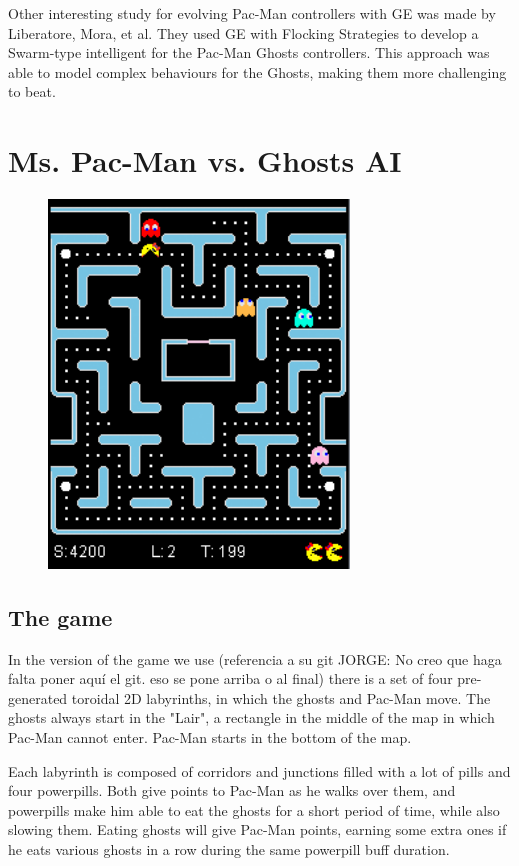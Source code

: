\documentclass{llncs}
\newcommand{\pacman}{Ms. Pac-Man vs. Ghosts }
\newcommand{\paco}{Pac-Man }
\begin{document}
Other interesting study for evolving Pac-Man controllers with GE was made by Liberatore, Mora, et al.\cite{Liberatore2014}
They used GE with Flocking Strategies to develop a Swarm-type intelligent for the Pac-Man Ghosts controllers. This approach was able to model complex behaviours for the Ghosts, making them more challenging to beat.

%
\section{\pacman AI}
\label{sec:pacmanai}
%


\begin{figure}[H]
	\centering
	\includegraphics[width=8cm]{images/PacMan_ss.png}
\end{figure}


\subsection{The game}

In the version of the game we use {\color{red}(referencia a su git JORGE: No creo que haga falta poner aquí el git. eso se pone arriba o al final)} there is a set of four pre-generated toroidal 2D labyrinths, in which the ghosts and \paco move. The ghosts always start in the "Lair", a rectangle in the middle of the map in which \paco cannot enter. \paco starts in the bottom of the map.

Each labyrinth is composed of corridors and junctions filled with a lot of pills and four powerpills. Both give points to \paco as he walks over them, and powerpills make him able to eat the ghosts for a short period of time, while also slowing them. Eating ghosts will give \paco points, earning some extra ones if he eats various ghosts in a row during the same powerpill buff duration.
\end{document}
